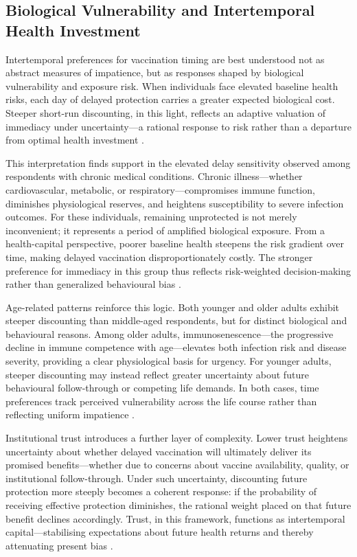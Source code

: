 \subsection{Biological Vulnerability and Intertemporal Health Investment}

Intertemporal preferences for vaccination timing are best understood not as abstract measures of impatience, but as responses shaped by biological vulnerability and exposure risk. When individuals face elevated baseline health risks, each day of delayed protection carries a greater expected biological cost. Steeper short-run discounting, in this light, reflects an adaptive valuation of immediacy under uncertainty---a rational response to risk rather than a departure from optimal health investment \parencite{Grossman1972, Attema2018}.

This interpretation finds support in the elevated delay sensitivity observed among respondents with chronic medical conditions. Chronic illness---whether cardiovascular, metabolic, or respiratory---compromises immune function, diminishes physiological reserves, and heightens susceptibility to severe infection outcomes. For these individuals, remaining unprotected is not merely inconvenient; it represents a period of amplified biological exposure. From a health-capital perspective, poorer baseline health steepens the risk gradient over time, making delayed vaccination disproportionately costly. The stronger preference for immediacy in this group thus reflects risk-weighted decision-making rather than generalized behavioural bias \parencite{Bok2024, Brewer2017}.

Age-related patterns reinforce this logic. Both younger and older adults exhibit steeper discounting than middle-aged respondents, but for distinct biological and behavioural reasons. Among older adults, immunosenescence---the progressive decline in immune competence with age---elevates both infection risk and disease severity, providing a clear physiological basis for urgency. For younger adults, steeper discounting may instead reflect greater uncertainty about future behavioural follow-through or competing life demands. In both cases, time preferences track perceived vulnerability across the life course rather than reflecting uniform impatience \parencite{Lawless2013, Wang2018}.

Institutional trust introduces a further layer of complexity. Lower trust heightens uncertainty about whether delayed vaccination will ultimately deliver its promised benefits---whether due to concerns about vaccine availability, quality, or institutional follow-through. Under such uncertainty, discounting future protection more steeply becomes a coherent response: if the probability of receiving effective protection diminishes, the rational weight placed on that future benefit declines accordingly. Trust, in this framework, functions as intertemporal capital---stabilising expectations about future health returns and thereby attenuating present bias \parencite{Brewer2017, Betsch2018}.


